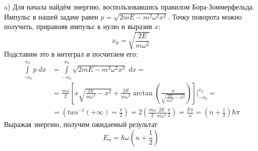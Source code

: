 a) Для начала найдём энергию, воспользовавшись правилом Бора-Зоммерфельда. Импульс в нашей задаче равен $p = \sqrt{2mE - m^2\omega^2x^2}$. Точку поворота можно получить, приравняв импульс к нулю и выразив $x$:
\[
x_0 = \sqrt{\frac{2E}{m\omega^2}}
\]
Подставим это в интеграл и посчитаем его:
\begin{align*}
\int\limits_{-x_0}^{x_0}p\;dx & = \int\limits_{-x_0}^{x_0}\sqrt{2mE - m^2\omega^2x^2}\;dx =\\& = \frac{m\omega}{2}\left[x\sqrt{\frac{2E}{m\omega^2}- x^2} + \frac{2E}{m\omega^2}\arctan\left( \frac{x}{\sqrt{\frac{2E}{m\omega^2} - x^2}} \right)\right]\Bigg|_{-x_0}^{x_0} = \\ & = \left( tan^{-1}(+\infty) = \frac{\pi}{2}\right) = 2(\frac{m\omega}{2}\frac{2E}{m\omega^2}\frac{\pi}{2}) = \frac{E\pi}{\omega} = (n + \frac{1}{2})\hbar\pi
\end{align*}
Выражая энергию, получим ожидаемый результат
\[
E_n = \hbar\omega(n + \frac{1}{2})
\]

